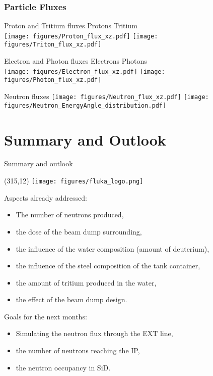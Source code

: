 \documentclass[xcolor={dvipsnames}]{beamer}
\newcommand{\flukalogo}{
  \setlength{\TPHorizModule}{1pt}
  \setlength{\TPVertModule}{1pt}
  \begin{textblock}{1}(315,12)
   \texttt{[image: figures/fluka\_logo.png]}
  \end{textblock}
}
\begin{document}
\subsubsection{Particle Fluxes}
\begin{frame}{Proton and Tritium fluxes}
\centering
\hspace*{2cm} Protons \hfill Tritium \hspace*{2cm} \\
  \texttt{[image: figures/Proton\_flux\_xz.pdf]}
  \texttt{[image: figures/Triton\_flux\_xz.pdf]}
\end{frame}
\begin{frame}{Electron and Photon fluxes}
\centering
\hspace*{2cm} Electrons \hfill Photons \hspace*{2cm} \\
  \texttt{[image: figures/Electron\_flux\_xz.pdf]}
  \texttt{[image: figures/Photon\_flux\_xz.pdf]}
\end{frame}
\begin{frame}{Neutron fluxes}
\centering
  \texttt{[image: figures/Neutron\_flux\_xz.pdf]}
  \texttt{[image: figures/Neutron\_EnergyAngle\_distribution.pdf]}
\end{frame}



\section{Summary and Outlook}
\begin{frame}{Summary and outlook}
 \flukalogo
 Aspects already addressed:
\begin{itemize}
 \item The number of neutrons produced,
 \item the dose of the beam dump surrounding,
 \item the influence of the water composition (amount of deuterium),
 \item the influence of the steel composition of the tank container,
 \item the amount of tritium produced in the water,
 \item the effect of the beam dump design.
\end{itemize}
\vspace*{0.2cm}
 Goals for the next months:
\begin{itemize}
 \item Simulating the neutron flux through the EXT line,
 \item the number of neutrons reaching the IP,
 \item the neutron occupancy in SiD.
\end{itemize}
\end{frame}
\end{document}
